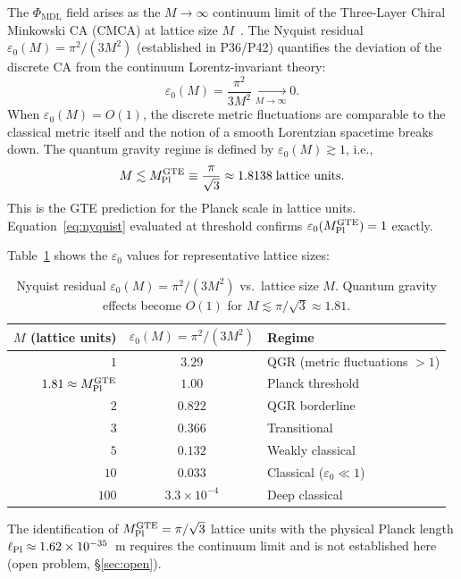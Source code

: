 \documentclass[11pt]{article}
\theoremstyle{remark}
\newcommand{\GTE}{\text{GTE}}
\newcommand{\PHIMDL}{\Phi_{\mathrm{MDL}}}
\newcommand{\epsz}{\varepsilon_0}
\newcommand{\MPltot}{M_{\rm Pl}^{\GTE}}
\begin{document}
The $\PHIMDL$ field arises as the $M\to\infty$ continuum limit of the
Three-Layer Chiral Minkowski CA (CMCA) at lattice size $M$~\cite{SpivackCMCA,SpivackPhiMDLField}.
The Nyquist residual $\epsz(M) = \pi^2/(3M^2)$ (established in
P36/P42) quantifies the deviation of the discrete CA from the continuum Lorentz-invariant
theory:
\begin{equation}
  \epsz(M) = \frac{\pi^2}{3M^2} \xrightarrow[M\to\infty]{} 0.
\label{eq:nyquist}
\end{equation}
When $\epsz(M) = O(1)$, the discrete metric fluctuations are comparable to the classical
metric itself and the notion of a smooth Lorentzian spacetime breaks down.
The quantum gravity regime is defined by $\epsz(M) \gtrsim 1$, i.e.,
\begin{equation}
  M \lesssim \MPltot \equiv \frac{\pi}{\sqrt{3}} \approx 1.8138\;\text{lattice units}.
\label{eq:mpl}
\end{equation}
This is the GTE prediction for the Planck scale in lattice units.
Equation~\eqref{eq:nyquist} evaluated at threshold confirms $\epsz(\MPltot) = 1$ exactly.

Table~\ref{tab:eps0} shows the $\epsz$ values for representative lattice sizes:
\begin{table}[h]
\centering
\small
\renewcommand{\arraystretch}{1.2}
\begin{tabular}{@{}rcl@{}}
\toprule
$M$ (lattice units) & $\epsz(M) = \pi^2/(3M^2)$ & Regime\\
\midrule
$1$ & $3.29$ & QGR (metric fluctuations $> 1$)\\
$1.81 \approx \MPltot$ & $1.00$ & Planck threshold\\
$2$ & $0.822$ & QGR borderline\\
$3$ & $0.366$ & Transitional\\
$5$ & $0.132$ & Weakly classical\\
$10$ & $0.033$ & Classical ($\epsz \ll 1$)\\
$100$ & $3.3\times10^{-4}$ & Deep classical\\
\bottomrule
\end{tabular}
\caption{Nyquist residual $\epsz(M) = \pi^2/(3M^2)$ vs.\ lattice size $M$.
  Quantum gravity effects become $O(1)$ for $M \lesssim \pi/\sqrt{3} \approx 1.81$.}
\label{tab:eps0}
\end{table}

The identification of $\MPltot = \pi/\sqrt{3}$ lattice units with the physical Planck
length $\ell_{\rm Pl} \approx 1.62\times10^{-35}$~m requires the continuum limit
and is not established here (open problem, \S\ref{sec:open}).
\end{document}
